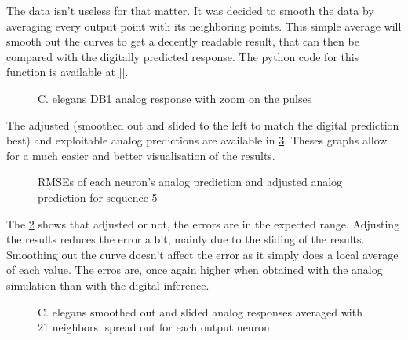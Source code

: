 The data isn't useless for that matter. It was decided to smooth the data by averaging every output point with its neighboring points. This simple average will smooth out the curves to get a decently readable result, that can then be compared with the digitally predicted response. The python code for this function is available at \cref{}. %

\begin{figure}[H]
  \centering
  
  \caption{\acs{C. elegans} DB1 analog response with zoom on the pulses}
  \label{graph:zoom5Celegans}
\end{figure}

The adjusted (smoothed out and slided to the left to match the digital prediction best) and exploitable analog predictions are available in \cref{graph:smooth5Celegans}. Theses graphs allow for a much easier and better visualisation of the results.

\begin{figure}[H]
  \centering
  
  \caption{\acp{RMSE} of each neuron's analog prediction and adjusted analog prediction for sequence 5}
  \label{bar:rmse5}
\end{figure}

The \cref{bar:rmse5} shows that adjusted or not, the errors are in the expected range. Adjusting the results reduces the error a bit, mainly due to the sliding of the results. Smoothing out the curve doesn't affect the error as it simply does a local average of each value. The erros are, once again higher when obtained with the analog simulation than with the digital inference.

\begin{figure}[H]
  \centering
  \begin{minipage}{\columnwidth}
    \hfill
  \end{minipage}
  \begin{minipage}{\columnwidth}
    \hfill
  \end{minipage}
  \caption{\ac{C. elegans} smoothed out and slided analog responses averaged with $21$ neighbors, spread out for each output neuron}
  \label{graph:smooth5Celegans}
\end{figure}

